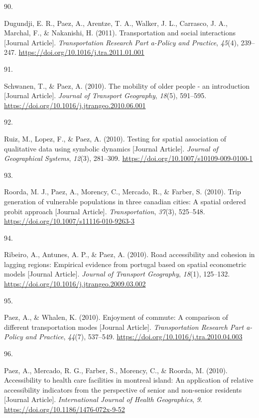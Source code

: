 \documentclass[10pt,a4paper,]{twentysecondcv}
\newlength{\csllabelwidth}
\newcommand{\CSLLeftMargin}[1]{\parbox[t]{\csllabelwidth}{#1}}
\newcommand{\CSLRightInline}[1]{\parbox[t]{\linewidth - \csllabelwidth}{#1}}
\begin{document}
\leavevmode{}%
\CSLLeftMargin{90. }%
\CSLRightInline{Dugundji, E. R., Paez, A., Arentze, T. A., Walker, J.
L., Carrasco, J. A., Marchal, F., \& Nakanishi, H. (2011).
Transportation and social interactions {[}Journal Article{]}.
\emph{Transportation Research Part a-Policy and Practice}, \emph{45}(4),
239--247. \url{https://doi.org/10.1016/j.tra.2011.01.001}}

\leavevmode{}%
\CSLLeftMargin{91. }%
\CSLRightInline{Schwanen, T., \& Paez, A. (2010). The mobility of older
people - an introduction {[}Journal Article{]}. \emph{Journal of
Transport Geography}, \emph{18}(5), 591--595.
\url{https://doi.org/10.1016/j.jtrangeo.2010.06.001}}

\leavevmode{}%
\CSLLeftMargin{92. }%
\CSLRightInline{Ruiz, M., Lopez, F., \& Paez, A. (2010). Testing for
spatial association of qualitative data using symbolic dynamics
{[}Journal Article{]}. \emph{Journal of Geographical Systems},
\emph{12}(3), 281--309. \url{https://doi.org/10.1007/s10109-009-0100-1}}

\leavevmode{}%
\CSLLeftMargin{93. }%
\CSLRightInline{Roorda, M. J., Paez, A., Morency, C., Mercado, R., \&
Farber, S. (2010). Trip generation of vulnerable populations in three
canadian cities: A spatial ordered probit approach {[}Journal
Article{]}. \emph{Transportation}, \emph{37}(3), 525--548.
\url{https://doi.org/10.1007/s11116-010-9263-3}}

\leavevmode{}%
\CSLLeftMargin{94. }%
\CSLRightInline{Ribeiro, A., Antunes, A. P., \& Paez, A. (2010). Road
accessibility and cohesion in lagging regions: Empirical evidence from
portugal based on spatial econometric models {[}Journal Article{]}.
\emph{Journal of Transport Geography}, \emph{18}(1), 125--132.
\url{https://doi.org/10.1016/j.jtrangeo.2009.03.002}}

\leavevmode{}%
\CSLLeftMargin{95. }%
\CSLRightInline{Paez, A., \& Whalen, K. (2010). Enjoyment of commute: A
comparison of different transportation modes {[}Journal Article{]}.
\emph{Transportation Research Part a-Policy and Practice}, \emph{44}(7),
537--549. \url{https://doi.org/10.1016/j.tra.2010.04.003}}

\leavevmode{}%
\CSLLeftMargin{96. }%
\CSLRightInline{Paez, A., Mercado, R. G., Farber, S., Morency, C., \&
Roorda, M. (2010). Accessibility to health care facilities in montreal
island: An application of relative accessibility indicators from the
perspective of senior and non-senior residents {[}Journal Article{]}.
\emph{International Journal of Health Geographics}, \emph{9}.
\url{https://doi.org/10.1186/1476-072x-9-52}}
\end{document}
